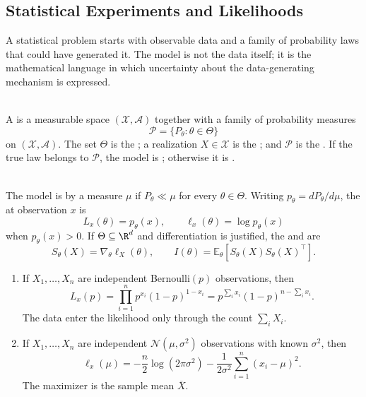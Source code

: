 \subsection{Statistical Experiments and Likelihoods}

A statistical problem starts with observable data and a family of probability laws that could have generated it.  The model is not the data itself; it is the mathematical language in which uncertainty about the data-generating mechanism is expressed.

\begin{definition} \label{def:statistical-experiment-and-model} \\
A  is a measurable space $(\mathcal{X},\mathcal{A})$ together with a family of probability measures
\[
\mathcal{P}=\{P_\theta:\theta\in\Theta\}
\]
on $(\mathcal{X},\mathcal{A})$.  The set $\Theta$ is the ; a realization $X\in\mathcal{X}$ is the ; and $\mathcal{P}$ is the .  If the true law belongs to $\mathcal{P}$, the model is ; otherwise it is .
\end{definition}

\begin{definition} \label{def:dominated-model-likelihood-score-information} \\
The model is  by a measure $\mu$ if $P_\theta\ll\mu$ for every $\theta\in\Theta$.  Writing $p_\theta=dP_\theta/d\mu$, the  at observation $x$ is
\[
L_x(\theta)=p_\theta(x),
\qquad
\ell_x(\theta)=\log p_\theta(x)
\]
when $p_\theta(x)>0$.  If $\Theta\subseteq\R^d$ and differentiation is justified, the  and  are
\[
S_\theta(X)=\nabla_\theta\ell_X(\theta),
\qquad
I(\theta)=\mathbb{E}_\theta\!\left[S_\theta(X)S_\theta(X)^\top\right].
\]
\end{definition}

\begin{example} \label{ex:bernoulli-and-normal-likelihoods} 
\begin{enumerate}[label=(\roman*)]
\setlength{\itemsep}{0pt}
\item If $X_1,\ldots,X_n$ are independent Bernoulli$(p)$ observations, then
\[
L_x(p)=\prod_{i=1}^n p^{x_i}(1-p)^{1-x_i}
=p^{\sum_i x_i}(1-p)^{n-\sum_i x_i}.
\]
The data enter the likelihood only through the count $\sum_iX_i$.
\item If $X_1,\ldots,X_n$ are independent $\mathcal{N}(\mu,\sigma^2)$ observations with known $\sigma^2$, then
\[
\ell_x(\mu)=-\frac{n}{2}\log(2\pi\sigma^2)-\frac{1}{2\sigma^2}\sum_{i=1}^n(x_i-\mu)^2.
\]
The maximizer is the sample mean $\overline{X}$.
\end{enumerate}
\end{example}

